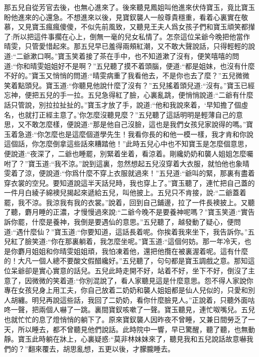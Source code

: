 \begin{parag}
    那五兒自從芳官去後，也無心進來了。後來聽見鳳姐叫他進來伏侍寶玉，竟比寶玉盼他進來的心還急。不想進來以後，見寶釵襲人一般尊貴穩重，看着心裏實在敬慕，又見寶玉瘋瘋傻傻，不似先前風致，又聽見王夫人爲女孩子們和寶玉頑笑都攆了:所以把這件事擱在心上，倒無一毫的兒女私情了。怎奈這位呆爺今晚把他當作晴雯，只管愛惜起來。那五兒早已羞得兩頰紅潮，又不敢大聲說話，只得輕輕的說道:“二爺漱口啊。”寶玉笑着接了茶在手中，也不知道漱了沒有，便笑嘻嘻的問道:“你和晴雯姐姐好不是啊？”五兒聽了摸不着頭腦，便道:“都是姐妹，也沒有什麼不好的。”寶玉又悄悄的問道:“晴雯病重了我看他去，不是你也去了麼？”五兒微微笑着點頭兒。寶玉道:“你聽見他說什麼了沒有？”五兒搖着頭兒道:“沒有。”寶玉已經忘神，便把五兒的手一拉。五兒急得紅了臉，心裏亂跳，便悄悄說道:“二爺有什麼話只管說，別拉拉扯扯的。”寶玉才放了手，說道:“他和我說來着，‘早知擔了個虛名，也就打正經主意了。’你怎麼沒聽見麼？”五兒聽了這話明明是輕薄自己的意思，又不敢怎麼樣，便說道:“那是他自己沒臉，這也是我們女孩兒家說得的嗎。”寶玉着急道:“你怎麼也是這麼個道學先生！我看你長的和他一模一樣，我才肯和你說這個話，你怎麼倒拿這些話來糟踏他！”此時五兒心中也不知寶玉是怎麼個意思，便說道:“夜深了，二爺也睡罷，別緊着坐着，看涼着。剛纔奶奶和襲人姐姐怎麼囑咐了？”寶玉道:“我不涼。”說到這裏，忽然想起五兒沒穿着大衣服，就怕他也象晴雯着了涼，便說道:“你爲什麼不穿上衣服就過來！”五兒道:“爺叫的緊，那裏有盡着穿衣裳的空兒。要知道說這半天話兒時，我也穿上了。”寶玉聽了，連忙把自己蓋的一件月白綾子綿襖兒揭起來遞給五兒，叫他披上。五兒只不肯接，說:“二爺蓋着罷，我不涼。我涼我有我的衣裳。”說着，回到自己鋪邊，拉了一件長襖披上。又聽了聽，麝月睡的正濃，才慢慢過來說:“二爺今晚不是要養神呢嗎？”寶玉笑道:“實告訴你罷，什麼是養神，我倒是要遇仙的意思。”五兒聽了，越發動了疑心，便問道:“遇什麼仙？”寶玉道:“你要知道，這話長着呢。你挨着我來坐下，我告訴你。”五兒紅了臉笑道:“你在那裏躺着，我怎麼坐呢。”寶玉道:“這個何妨。那一年冷天，也是你麝月姐姐和你晴雯姐姐頑，我怕凍着他，還把他攬在被裏渥着呢。這有什麼的！大凡一個人總不要酸文假醋纔好。”五兒聽了，句句都是寶玉調戲之意。那知這位呆爺卻是實心實意的話兒。五兒此時走開不好，站着不好，坐下不好，倒沒了主意了，因微微的笑着道:“你別混說了，看人家聽見這是什麼意思。怨不得人家說你專在女孩兒身上用工夫，你自己放着二奶奶和襲人姐姐都是仙人兒似的，只愛和別人胡纏。明兒再說這些話，我回了二奶奶，看你什麼臉見人。”正說着，只聽外面咕咚一聲，把兩個人嚇了一跳。裏間寶釵咳嗽了一聲。寶玉聽見，連忙呶嘴兒。五兒也就忙忙的息了燈悄悄的躺下了。原來寶釵襲人因昨夜不曾睡，又兼日間勞乏了一天，所以睡去，都不曾聽見他們說話。此時院中一響，早已驚醒，聽了聽，也無動靜。寶玉此時躺在牀上，心裏疑惑:“莫非林妹妹來了，聽見我和五兒說話故意嚇我們的？”翻來覆去，胡思亂想，五更以後，才朦朧睡去。
\end{parag}


